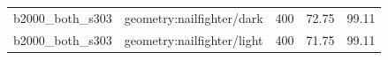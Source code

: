 \begin{longtable}{l>{\raggedright\arraybackslash}p{.42\linewidth}rrr}
b2000\_\allowbreak{}both\_\allowbreak{}s303 & %
geometry:nailfighter/dark & %
400 & %
72.75 & %
99.11 \\ %

b2000\_\allowbreak{}both\_\allowbreak{}s303 & %
geometry:nailfighter/light & %
400 & %
71.75 & %
99.11 \\ %


\end{longtable}
